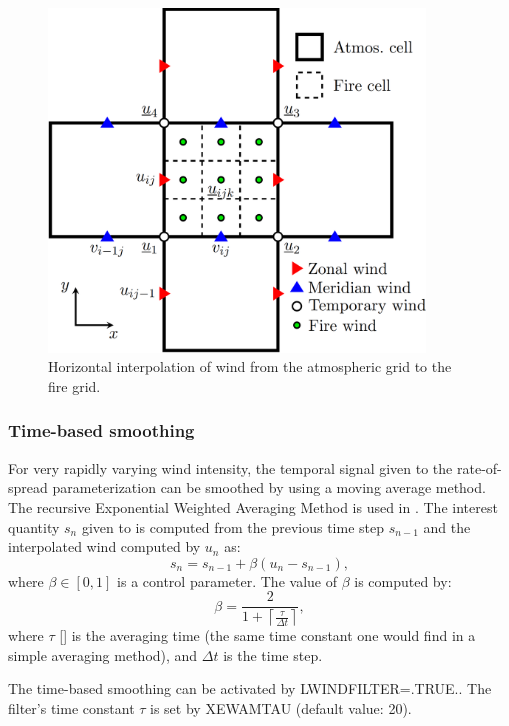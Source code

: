 \begin{figure}
	\centering
	\includegraphics[width=10cm]{EPS/Blaze_wind_interp}
	\caption{Horizontal interpolation of wind from the atmospheric grid to the fire grid.}
  	\label{fig:windinterpH}
\end{figure}

\subsubsection{Time-based smoothing}

For very rapidly varying wind intensity, the temporal signal given to the rate-of-spread parameterization can be smoothed by using a moving average method. The recursive Exponential Weighted Averaging Method is used in \Blaze. The interest quantity $s_n$ given to \Blaze{} is computed from the previous time step $s_{n-1}$ and the interpolated wind computed by \MNH{} $u_n$ as:
\begin{equation}
  s_n = s_{n-1} + \beta (u_n - s_{n-1}),
\end{equation}
where $\beta \in [0, 1]$ is a control parameter.
The value of $\beta$ is computed by:
\begin{equation}
  \beta = \frac{2}{1 + \left \lceil \frac{\tau}{\Delta t} \right \rceil},
\end{equation}
where $\tau$ [\second] is the averaging time (the same time constant one would find in a simple averaging method), and $\Delta t$ is the \MNH{} time step.

The time-based smoothing can be activated by LWINDFILTER=.TRUE.. The filter's time constant $\tau$ is set by XEWAMTAU (default value: 20\second).

